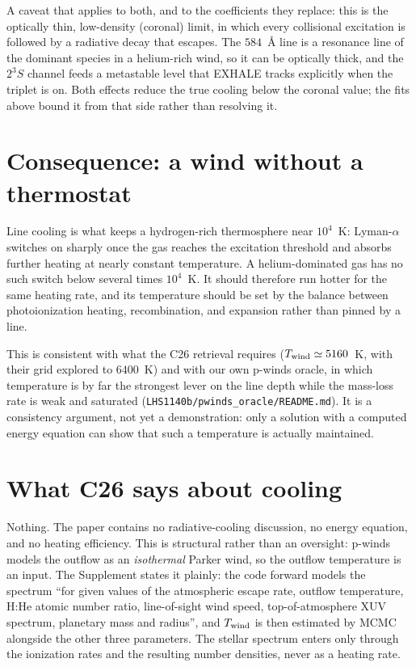 \documentclass[english,a4paper]{my_memo}
\begin{document}
A caveat that applies to both, and to the coefficients they replace: this is
the optically thin, low-density (coronal) limit, in which every collisional
excitation is followed by a radiative decay that escapes. The $584$~\AA{}
line is a resonance line of the dominant species in a helium-rich wind, so
it can be optically thick, and the $2^3S$ channel feeds a metastable level
that EXHALE tracks explicitly when the triplet is on. Both effects reduce the
true cooling below the coronal value; the fits above bound it from that side
rather than resolving it.

\section{Consequence: a wind without a thermostat}

Line cooling is what keeps a hydrogen-rich thermosphere near
$10^4$~K: Lyman-$\alpha$ switches on sharply once the gas reaches the
excitation threshold and absorbs further heating at nearly constant
temperature. A helium-dominated gas has no such switch below several times
$10^4$~K. It should therefore run hotter for the same heating rate, and its
temperature should be set by the balance between photoionization heating,
recombination, and expansion rather than pinned by a line.

This is consistent with what the C26 retrieval requires
($T_{\rm wind} \simeq 5160$~K, with their grid explored to $6400$~K) and
with our own p-winds oracle, in which temperature is by far the strongest
lever on the line depth while the mass-loss rate is weak and saturated
(\texttt{LHS1140b/pwinds\_oracle/README.md}). It is a consistency argument,
not yet a demonstration: only a solution with a computed energy equation can
show that such a temperature is actually maintained.

\section{What C26 says about cooling}

Nothing. The paper contains no radiative-cooling discussion, no energy
equation, and no heating efficiency. This is structural rather than an
oversight: p-winds models the outflow as an \emph{isothermal} Parker wind,
so the outflow temperature is an input. The Supplement states it plainly:
the code forward models the spectrum ``for given values of the atmospheric
escape rate, outflow temperature, H:He atomic number ratio, line-of-sight
wind speed, top-of-atmosphere XUV spectrum, planetary mass and radius'', and
$T_{\rm wind}$ is then estimated by MCMC alongside the other three
parameters. The stellar spectrum enters only through the ionization rates
and the resulting number densities, never as a heating rate.
\end{document}
